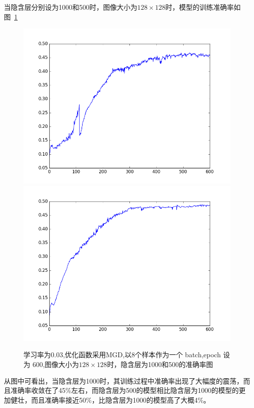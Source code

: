 当隐含层分别设为1000和500时，图像大小为$128\times 128$时，模型的训练准确率如图~\ref{fig:bp8}
\begin{figure}[htb]
\centering
\includegraphics[scale=0.35]{../figures/Log/BP_new3/BP_new3_acc.png} 
\includegraphics[scale=0.35]{../figures/Log/BP_new6/BP_new6_acc.png} \\
\caption{学习率为0.03,优化函数采用MGD,以8个样本作为一个 batch,epoch 设为 600,图像大小为$128\times 128$时，隐含层为1000和500的准确率图}
\label{fig:bp8}
\end{figure}
从图中可看出，当隐含层为1000时，其训练过程中准确率出现了大幅度的震荡，而且准确率收敛在了45\%左右，而隐含层为500的模型相比隐含层为1000的模型的更加健壮，而且准确率接近50\%，比隐含层为1000的模型高了大概4\%。


